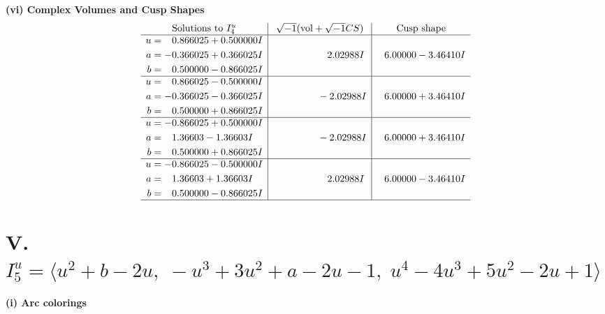 \documentclass[1p]{elsarticle_modified}
\theoremstyle{definition}
\newcommand{\I}{\sqrt{-1}}
\begin{document}
\newpage\flushleft \textbf{(vi) Complex Volumes and Cusp Shapes}
$$\begin{array}{c|c|c}  
\text{Solutions to }I^u_{4}& \I (\text{vol} + \sqrt{-1}CS) & \text{Cusp shape}\\
 \hline 
\begin{aligned}
u &= \phantom{-}0.866025 + 0.500000 I \\
a &= -0.366025 + 0.366025 I \\
b &= \phantom{-}0.500000 - 0.866025 I\end{aligned}
 & \phantom{-0.000000 -}2.02988 I & \phantom{-}6.00000 - 3.46410 I \\ \hline\begin{aligned}
u &= \phantom{-}0.866025 - 0.500000 I \\
a &= -0.366025 - 0.366025 I \\
b &= \phantom{-}0.500000 + 0.866025 I\end{aligned}
 & \phantom{-0.000000 } -2.02988 I & \phantom{-}6.00000 + 3.46410 I \\ \hline\begin{aligned}
u &= -0.866025 + 0.500000 I \\
a &= \phantom{-}1.36603 - 1.36603 I \\
b &= \phantom{-}0.500000 + 0.866025 I\end{aligned}
 & \phantom{-0.000000 } -2.02988 I & \phantom{-}6.00000 + 3.46410 I \\ \hline\begin{aligned}
u &= -0.866025 - 0.500000 I \\
a &= \phantom{-}1.36603 + 1.36603 I \\
b &= \phantom{-}0.500000 - 0.866025 I\end{aligned}
 & \phantom{-0.000000 -}2.02988 I & \phantom{-}6.00000 - 3.46410 I\\
 \hline 
 \end{array}$$\newpage\newpage\renewcommand{\arraystretch}{1}
\centering \section*{V. $I^u_{5}= \langle u^2+b-2 u,\;- u^3+3 u^2+a-2 u-1,\;u^4-4 u^3+5 u^2-2 u+1 \rangle$}
\flushleft \textbf{(i) Arc colorings}\\
\end{document}
